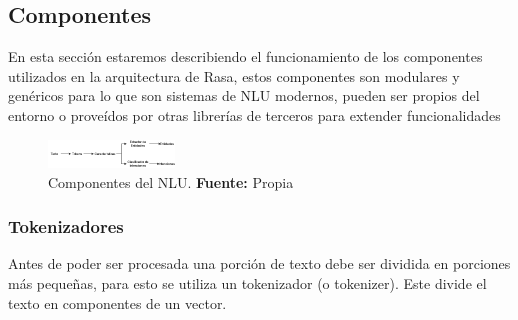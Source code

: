 \subsection{Componentes}
En esta sección estaremos describiendo el funcionamiento de los componentes
utilizados en la arquitectura de Rasa, estos componentes son modulares y genéricos para lo que son sistemas de NLU modernos, pueden ser propios del entorno
o proveídos por otras librerías de terceros para extender funcionalidades
\begin{figure}[H]
\begin{centering}
\includegraphics[angle=0,width=0.3\textwidth]{Figuras/Componentes_NLU.png}
\par \end{centering}
\caption[Componentes del NLU]{Componentes del NLU. \textbf{Fuente:} Propia}
\label{Estructura}
\end{figure}
\subsubsection{Tokenizadores}
Antes de poder ser procesada una porción de texto debe ser dividida en porciones más pequeñas, para esto se utiliza 
un tokenizador (o tokenizer).   Este divide el texto en componentes de un vector.
